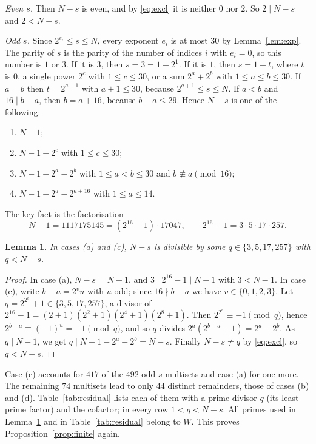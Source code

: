 \documentclass[11pt]{amsart}
\theoremstyle{plain}
\newtheorem{lemma}[theorem]{Lemma}
\theoremstyle{definition}
\begin{document}
\emph{Even $s$.} Then $N-s$ is even, and by \eqref{eq:excl} it is neither $0$ nor $2$. So $2\mid N-s$ and $2<N-s$.

\emph{Odd $s$.} Since $2^{e_i}\le s\le N$, every exponent $e_i$ is at most $30$ by Lemma~\ref{lem:exp}. The parity of $s$ is the parity of the number of indices $i$ with $e_i=0$, so this number is $1$ or $3$. If it is $3$, then $s=3=1+2^1$. If it is $1$, then $s=1+t$, where $t$ is $0$, a single power $2^c$ with $1\le c\le 30$, or a sum $2^a+2^b$ with $1\le a\le b\le 30$. If $a=b$ then $t=2^{a+1}$ with $a+1\le 30$, because $2^{a+1}\le s\le N$. If $a<b$ and $16\mid b-a$, then $b=a+16$, because $b-a\le 29$. Hence $N-s$ is one of the following:
\begin{enumerate}
\item[(a)] $N-1$;
\item[(b)] $N-1-2^{c}$ with $1\le c\le 30$;
\item[(c)] $N-1-2^{a}-2^{b}$ with $1\le a<b\le 30$ and $b\not\equiv a\pmod{16}$;
\item[(d)] $N-1-2^{a}-2^{a+16}$ with $1\le a\le 14$.
\end{enumerate}
The key fact is the factorisation
\[
N-1=1117175145=(2^{16}-1)\cdot 17047,\qquad 2^{16}-1=3\cdot 5\cdot 17\cdot 257.
\]

\begin{lemma}\label{lem:cover}
In cases \textup{(a)} and \textup{(c)}, $N-s$ is divisible by some $q\in\{3,5,17,257\}$ with $q<N-s$.
\end{lemma}

\begin{proof}
In case (a), $N-s=N-1$, and $3\mid 2^{16}-1\mid N-1$ with $3<N-1$. In case (c), write $b-a=2^v u$ with $u$ odd; since $16\nmid b-a$ we have $v\in\{0,1,2,3\}$. Let $q=2^{2^v}+1\in\{3,5,17,257\}$, a divisor of $2^{16}-1=(2+1)(2^2+1)(2^4+1)(2^8+1)$. Then $2^{2^v}\equiv -1\pmod q$, hence $2^{b-a}\equiv(-1)^u=-1\pmod q$, and so $q$ divides $2^a(2^{b-a}+1)=2^a+2^b$. As $q\mid N-1$, we get $q\mid N-1-2^a-2^b=N-s$. Finally $N-s\ne q$ by \eqref{eq:excl}, so $q<N-s$.
\end{proof}

Case (c) accounts for $417$ of the $492$ odd-$s$ multisets and case (a) for one more. The remaining $74$ multisets lead to only $44$ distinct remainders, those of cases (b) and (d). Table~\ref{tab:residual} lists each of them with a prime divisor $q$ (its least prime factor) and the cofactor; in every row $1<q<N-s$. All primes used in Lemma~\ref{lem:cover} and in Table~\ref{tab:residual} belong to $W$. This proves Proposition~\ref{prop:finite} again.
\end{document}
